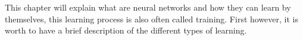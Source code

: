 This chapter will explain what are neural networks and how they can learn by themselves, this learning process is also often called training. First however, it is worth to have a brief description of the different types of learning.







